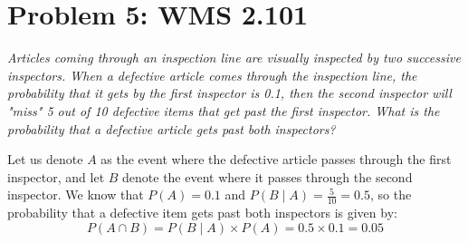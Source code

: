 \documentclass{article}
\begin{document}
\section*{Problem 5: WMS 2.101}
	\emph{Articles coming through an inspection line are visually inspected by two successive inspectors. When a defective article comes through the inspection line, the probability that it gets by the first inspector is 0.1, then the second inspector will "miss" 5 out of 10 defective items that get past the first inspector. What is the probability that a defective article gets past both inspectors?}
	
	\begin{sol}
		Let us denote $A$ as the event where the defective article passes through the first inspector, and let $B$ denote the event where it passes through the second inspector. We know that $P(A) = 0.1$ and $P(B \mid A) = \frac{5}{10} = 0.5$, so the probability that a defective item gets past both inspectors is given by:
		$$ P(A \cap B) = P(B \mid A) \times P(A) = 0.5 \times 0.1 = \boxed{0.05} $$
	\end{sol}

\pagebreak
\end{document}
